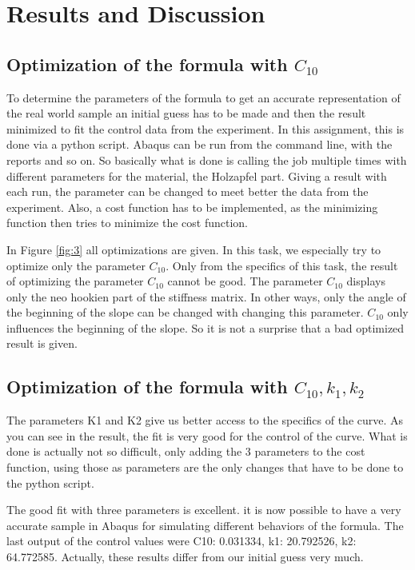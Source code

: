 \documentclass[12pt]{article}
\begin{document}
\section{Results and Discussion}
\subsection{Optimization of the formula with $C_{10}$}
To determine the parameters of the formula to get an accurate representation of the real world sample an initial guess has to be made and then the result minimized to fit the control data from the experiment.
In this assignment, this is done via a python script. Abaqus can be run from the command line, with the reports and so on. So basically what is done is calling the job multiple times with different parameters for the material, the Holzapfel part. Giving a result with each run, the parameter can be changed to meet better the data from the experiment. Also, a cost function has to be implemented, as the minimizing function then tries to minimize the cost function.

In Figure \ref{fig:3} all optimizations are given. In this task, we especially try to optimize only the parameter $C_{10}$. Only from the specifics of this task, the result of optimizing the parameter $C_{10}$ cannot be good. The parameter $C_{10}$ displays only the neo hookien part of the stiffness matrix. In other ways, only the angle of the beginning of the slope can be changed with changing this parameter. $C_{10}$ only influences the beginning of the slope. So it is not a surprise that a bad optimized result is given.
\subsection{Optimization of the formula with $C_{10}, k_{1}, k_{2}$}
The parameters K1 and K2 give us better access to the specifics of the curve. As you can see in the result, the fit is very good for the control of the curve. What is done is actually not so difficult, only adding the 3 parameters to the cost function, using those as parameters are the only changes that have to be done to the python script.

The good fit with three parameters is excellent. it is now possible to have a very accurate sample in Abaqus for simulating different behaviors of the formula. The last output of the control values were C10: 0.031334, k1: 20.792526, k2: 64.772585. Actually, these results differ from our initial guess very much.
\end{document}
